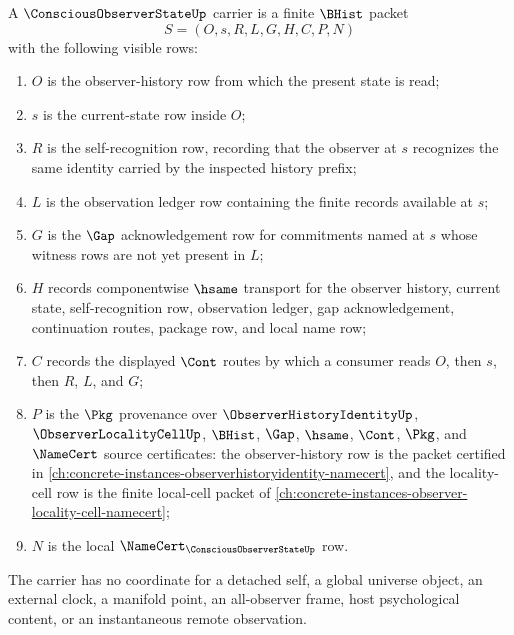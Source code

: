 \begin{definition}
\label{def:conscious-observer-state-carrier}
A $\ConsciousObserverStateUp$ carrier is a finite $\BHist$ packet
$$
S=(O,s,R,L,G,H,C,P,N)
$$
with the following visible rows:
\begin{enumerate}
\item $O$ is the observer-history row from which the present state is read;
\item $s$ is the current-state row inside $O$;
\item $R$ is the self-recognition row, recording that the observer at $s$ recognizes the same identity carried by the inspected history prefix;
\item $L$ is the observation ledger row containing the finite records available at $s$;
\item $G$ is the $\Gap$ acknowledgement row for commitments named at $s$ whose witness rows are not yet present in $L$;
\item $H$ records componentwise $\hsame$ transport for the observer history, current state, self-recognition row, observation ledger, gap acknowledgement, continuation routes, package row, and local name row;
\item $C$ records the displayed $\Cont$ routes by which a consumer reads $O$, then $s$, then $R$, $L$, and $G$;
\item $P$ is the $\Pkg$ provenance over $\ObserverHistoryIdentityUp$, $\ObserverLocalityCellUp$, $\BHist$, $\Gap$, $\hsame$, $\Cont$, $\Pkg$, and $\NameCert$ source certificates: the observer-history row is the packet certified in \autoref{ch:concrete-instances-observerhistoryidentity-namecert}, and the locality-cell row is the finite local-cell packet of \autoref{ch:concrete-instances-observer-locality-cell-namecert};
\item $N$ is the local $\NameCert_{\ConsciousObserverStateUp}$ row.
\end{enumerate}
The carrier has no coordinate for a detached self, a global universe object, an external clock, a manifold point, an all-observer frame, host psychological content, or an instantaneous remote observation.
\end{definition}

